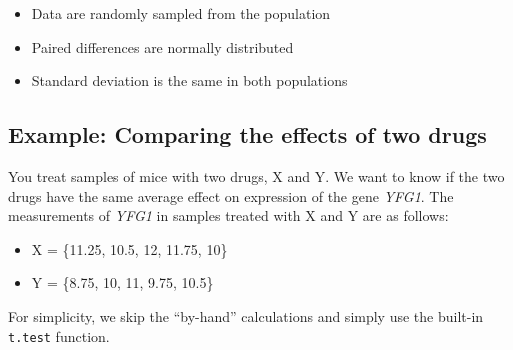 \documentclass[]{book}
\newenvironment{Shaded}{\begin{snugshade}}{\end{snugshade}}
\newcommand{\CommentTok}[1]{\textcolor[rgb]{0.56,0.35,0.01}{\textit{#1}}}
\newcommand{\DataTypeTok}[1]{\textcolor[rgb]{0.13,0.29,0.53}{#1}}
\newcommand{\DecValTok}[1]{\textcolor[rgb]{0.00,0.00,0.81}{#1}}
\newcommand{\FloatTok}[1]{\textcolor[rgb]{0.00,0.00,0.81}{#1}}
\newcommand{\KeywordTok}[1]{\textcolor[rgb]{0.13,0.29,0.53}{\textbf{#1}}}
\newcommand{\NormalTok}[1]{#1}
\newcommand{\OperatorTok}[1]{\textcolor[rgb]{0.81,0.36,0.00}{\textbf{#1}}}
\newcommand{\StringTok}[1]{\textcolor[rgb]{0.31,0.60,0.02}{#1}}
\providecommand{\tightlist}{%
  \setlength{\itemsep}{0pt}\setlength{\parskip}{0pt}}
\theoremstyle{definition}
\theoremstyle{definition}
\theoremstyle{definition}
\theoremstyle{remark}
\begin{document}
\begin{itemize}
\tightlist
\item
  Data are randomly sampled from the population
\item
  Paired differences are normally distributed
\item
  Standard deviation is the same in both populations
\end{itemize}

\hypertarget{example-comparing-the-effects-of-two-drugs}{%
\subsection{Example: Comparing the effects of two
drugs}\label{example-comparing-the-effects-of-two-drugs}}

You treat samples of mice with two drugs, X and Y. We want to know if
the two drugs have the same average effect on expression of the gene
\emph{YFG1}. The measurements of \emph{YFG1} in samples treated with X
and Y are as follows:

\begin{itemize}
\tightlist
\item
  X = \{11.25, 10.5, 12, 11.75, 10\}
\item
  Y = \{8.75, 10, 11, 9.75, 10.5\}
\end{itemize}

For simplicity, we skip the ``by-hand'' calculations and simply use the
built-in \texttt{t.test} function.

\begin{Shaded}
\end{Shaded}
\end{document}
